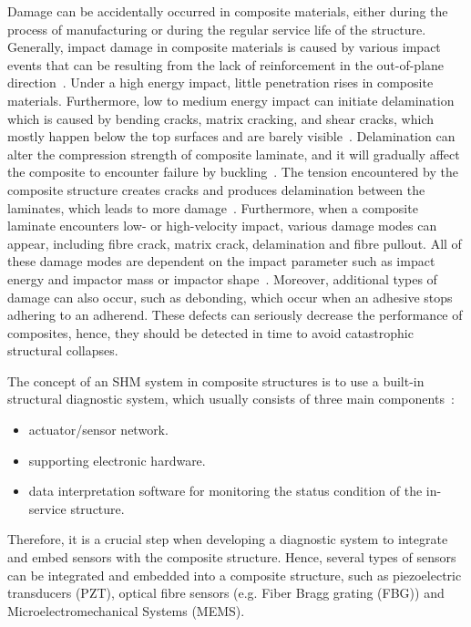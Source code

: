 Damage can be accidentally occurred in composite materials, either during the process of manufacturing or during the regular service life of the structure. 
Generally, impact damage in composite materials is caused by various impact events that can be resulting from the lack of reinforcement in the out-of-plane direction~\cite{Cai2012}. 
Under a high energy impact, little penetration rises in composite materials.  
Furthermore, low to medium energy impact can initiate delamination which is caused by bending cracks, matrix cracking, and shear cracks,  which mostly happen below the top surfaces and are barely visible~\cite{Cai2012}. 
Delamination can alter the compression strength of composite laminate, and it will gradually affect the composite to encounter failure by buckling~\cite{NurAzrieBtSafri2018}.
The tension encountered by the composite structure creates cracks and produces delamination between the laminates, which leads to more damage~\cite{NurAzrieBtSafri2018}. 
Furthermore, when a composite laminate encounters low- or high-velocity impact, various damage modes can appear, including fibre crack, matrix crack, delamination and fibre pullout. 
All of these damage modes are dependent on the impact parameter such as impact energy and impactor mass or impactor shape~\cite{NurAzrieBtSafri2018}.
Moreover, additional types of damage can also occur, such as debonding, which occur when an adhesive stops adhering to an adherend.
These defects can seriously decrease the performance of composites, hence, they should be detected in time to avoid catastrophic structural collapses.  

The concept of an SHM system in composite structures is to use a built-in structural diagnostic system, which usually consists of three main components~\cite{1}: 
\begin{itemize}
	\item actuator/sensor network.
	\item supporting electronic hardware.
	\item data interpretation software for monitoring the status condition of the in-service structure.
\end{itemize}
Therefore, it is a crucial step when developing a diagnostic system to integrate and embed sensors with the composite structure. 
Hence, several types of sensors can be integrated and embedded into a composite structure, such as piezoelectric transducers (PZT), optical fibre sensors (e.g. Fiber Bragg grating (FBG)) and Microelectromechanical Systems (MEMS).


